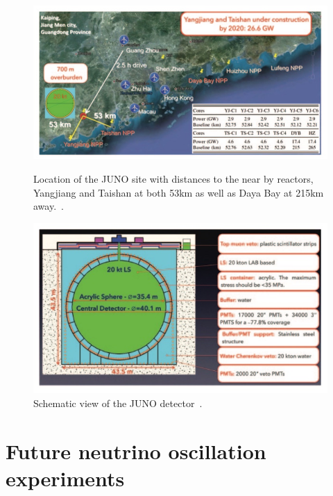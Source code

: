 \begin{figure}[h!]
  \centering
  \begin{minipage}[b]{0.49\textwidth}
    \includegraphics[width=\textwidth]{figures/juno1.jpeg}
    \vspace{2mm}
    \caption{Location of the JUNO site with distances to the near by reactors, Yangjiang and Taishan at both 53km as well as Daya Bay at 215km away.~\cite{75Juno}.}
    \label{fig:juno1}
  \end{minipage}
  \hfill
  \begin{minipage}[b]{0.49\textwidth}
    \includegraphics[width=\textwidth]{figures/juno2.jpeg}
       \vspace{2mm}
    \caption{Schematic view of the JUNO detector~\cite{75Juno}.}
     \label{fig:juno2}
  \end{minipage}
\end{figure}

\pagebreak
\section{Future neutrino oscillation experiments}

